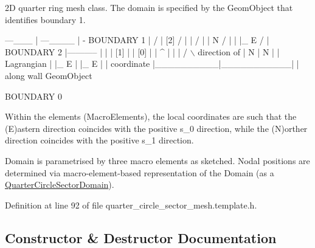 2D quarter ring mesh class. The domain is specified by the Geom\+Object that identifies boundary 1.


\begin{DoxyCode}
                     ---\_\_\_
                    |      ---\_\_\_\_
                    |              -   BOUNDARY 1
                    |               /  
                    |     [2]      /  |  
                    |             /     | 
                    | N          /        |  
                    | |\_ E      /          |    
     BOUNDARY 2     |-----------           |  
                    |          |    [1]    |
                    |   [0]    |           |  ^
                    |          |           | / \(\backslash\)  direction of
                    | N        |    N      |  |   Lagrangian 
                    | |\_ E     |    |\_ E   |  |   coordinate 
                    |\_\_\_\_\_\_\_\_\_\_|\_\_\_\_\_\_\_\_\_\_\_|  |   along wall GeomObject

                         BOUNDARY 0

Within the elements (MacroElements), the local coordinates
are such that the (E)astern direction coincides with the positive 
s\_0 direction,  \textcolor{keywordflow}{while} the (N)orther direction coincides with the positive 
s\_1 direction.
\end{DoxyCode}


Domain is parametrised by three macro elements as sketched. Nodal positions are determined via macro-\/element-\/based representation of the Domain (as a \hyperlink{classoomph_1_1QuarterCircleSectorDomain}{Quarter\+Circle\+Sector\+Domain}). 

Definition at line 92 of file quarter\+\_\+circle\+\_\+sector\+\_\+mesh.\+template.\+h.



\subsection{Constructor \& Destructor Documentation}
\mbox{\label{classoomph_1_1QuarterCircleSectorMesh_a3fbcc7dd28aefc3dddda607785695afc}} 
